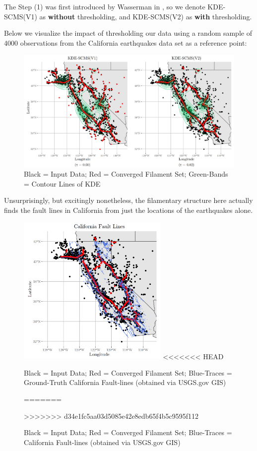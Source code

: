 \documentclass[letterpaper,fleqn]{article}
\theoremstyle{plain}
\theoremstyle{definition}
\newcommand{\1}{\mathds{1}}
\begin{document}
\mbox{}

The Step (1) was first introduced by Wasserman in \cite{SuRF}, so we denote KDE-SCMS(V1) as \textbf{without} thresholding, and KDE-SCMS(V2) as \textbf{with} thresholding. 

Below we visualize the impact of thresholding our data using a random sample of 4000 observations from the California earthquakes data set as a reference point:

\begin{figure}[!htb]
    \includegraphics[width=\textwidth]{combined.jpg}
    \caption{Black = Input Data; Red = Converged Filament Set; Green-Bands = Contour Lines of KDE}%
    \label{fig:thresholding}%
\end{figure}

\newpage

Unsurprisingly, but excitingly nonetheless, the filamentary structure here actually finds the fault lines in California from just the locations of the earthquakes alone.

\begin{figure}[!htb]
    \centering
    \includegraphics[width=0.65\textwidth]{faults_overlay.png}
<<<<<<< HEAD
    \caption{Black = Input Data; Red = Converged Filament Set; Blue-Traces = Ground-Truth California Fault-lines (obtained via USGS.gov GIS)}%
=======
    \caption{Black = Input Data; Red = Converged Filament Set; Blue-Traces = California Fault-lines (obtained via USGS.gov GIS)}%
>>>>>>> d34e1fc5aa03d5085e42e8edb65f4b5c9595f112
    \label{fig:faultlines}%
\end{figure}
\end{document}
